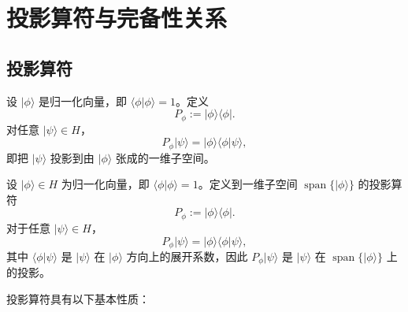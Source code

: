 \documentclass[UTF8,a4paper,11pt,openany]{ctexbook}
\begin{document}
\section{投影算符与完备性关系}

\subsection{投影算符}

设 $|\phi\rangle$ 是归一化向量，即 $\langle\phi|\phi\rangle=1$。定义
\begin{equation}
    P_\phi
    :=
    |\phi\rangle\langle\phi|.
\end{equation}
对任意 $|\psi\rangle\in H$，
\begin{equation}
    P_\phi|\psi\rangle
    =
    |\phi\rangle\langle\phi|\psi\rangle,
\end{equation}
即把 $|\psi\rangle$ 投影到由 $|\phi\rangle$ 张成的一维子空间。

\begin{definition}
设 $|\phi\rangle\in H$ 为归一化向量，即 $\langle\phi|\phi\rangle=1$。定义到一维子空间 $\operatorname{span}\{|\phi\rangle\}$ 的投影算符
\begin{equation}
    P_\phi:=|\phi\rangle\langle\phi|.
\end{equation}
对于任意 $|\psi\rangle\in H$，
\begin{equation}
    P_\phi|\psi\rangle
    =
    |\phi\rangle\langle\phi|\psi\rangle,
\end{equation}
其中 $\langle\phi|\psi\rangle$ 是 $|\psi\rangle$ 在 $|\phi\rangle$ 方向上的展开系数，因此 $P_\phi|\psi\rangle$ 是 $|\psi\rangle$ 在 $\operatorname{span}\{|\phi\rangle\}$ 上的投影。
\end{definition}

投影算符具有以下基本性质：
\end{document}
